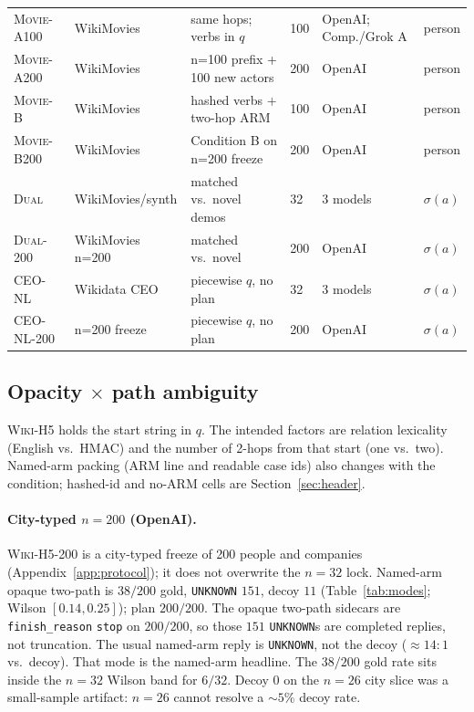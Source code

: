 \documentclass[10pt]{article} %
\begin{document}
\begin{table}[htbp]
{\begin{tabular}{@{}llllll@{}}
\textsc{Movie-A100} & WikiMovies & same hops; verbs in $q$ & 100 & OpenAI; Comp./Grok A & person \\
\textsc{Movie-A200} & WikiMovies & n=100 prefix + 100 new actors & 200 & OpenAI & person \\
\textsc{Movie-B} & WikiMovies & hashed verbs $+$ two-hop ARM & 100 & OpenAI & person \\
\textsc{Movie-B200} & WikiMovies & Condition B on n=200 freeze & 200 & OpenAI & person \\
\textsc{Dual} & WikiMovies/synth & matched vs.\ novel demos & 32 & 3 models & $\sigma(a)$ \\
\textsc{Dual-200} & WikiMovies n=200 & matched vs.\ novel & 200 & OpenAI & $\sigma(a)$ \\
\textsc{CEO-NL} & Wikidata CEO & piecewise $q$, no plan & 32 & 3 models & $\sigma(a)$ \\
\textsc{CEO-NL-200} & n=200 freeze & piecewise $q$, no plan & 200 & OpenAI & $\sigma(a)$ \\
\bottomrule
\end{tabular}%
}

\end{table}

\subsection{Opacity \texorpdfstring{$\times$}{x} path ambiguity}
\label{sec:fact2x2}

\textsc{Wiki-H5} holds the start string in $q$. The intended factors are
relation lexicality (English vs.\ HMAC) and the number of 2-hops from that
start (one vs.\ two). Named-arm packing (ARM line and readable case ids)
also changes with the condition; hashed-id and no-ARM cells are
Section~\ref{sec:header}.

\paragraph{City-typed $n{=}200$ (OpenAI).}
\textsc{Wiki-H5-200} is a city-typed freeze of 200 people and companies
(Appendix~\ref{app:protocol}); it does not overwrite the $n{=}32$ lock.
Named-arm opaque two-path is $38/200$ gold, \texttt{UNKNOWN} $151$, decoy
$11$ (Table~\ref{tab:modes}; Wilson $[0.14,0.25]$); plan $200/200$.
The opaque two-path sidecars are \texttt{finish\_reason} \texttt{stop} on
$200/200$, so those $151$ \texttt{UNKNOWN}s are completed replies, not
truncation.
The usual named-arm reply is \texttt{UNKNOWN}, not the decoy
(${\approx}14{:}1$ vs.\ decoy). That mode is the named-arm headline.
The $38/200$ gold rate sits inside the $n{=}32$ Wilson band for $6/32$.
Decoy $0$ on the $n{=}26$ city slice was a small-sample artifact:
$n{=}26$ cannot resolve a ${\sim}5\%$ decoy rate.
\end{document}
